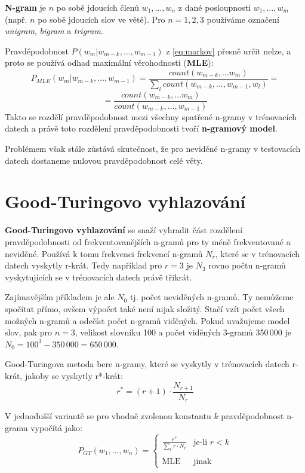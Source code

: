 \documentclass[12pt,a4paper]{report}
\begin{document}
\textbf{N-gram} je $n$ po sobě jdoucích členů $w_{1},\ldots,w_{n}$ z dané posloupnosti $w_{1},\ldots,w_{m}$ (např. $n$ po sobě jdoucích slov ve větě). Pro $n = 1, 2, 3$ používáme označení \textit{unigram}, \textit{bigram} a \textit{trigram}.

Pravděpodobnost $P(w_{m}|w_{m-k}, \ldots, w_{m-1})$ z \eqref{eq:markov} přesně určit nelze, a proto se používá odhad maximální věrohodnosti (\textbf{MLE}):
\begin{equation}\label{eq:pmle}
P_{MLE}(w_{m}|w_{m-k}, \ldots, w_{m-1}) = \frac{count(w_{m-k}, \ldots w_{m})}{\sum_{l} count(w_{m-k},\ldots,w_{m-1}, w_{l})} =
\end{equation}
\begin{equation}\nonumber
= \frac{count(w_{m-k}, \ldots w_{m})}{count(w_{m-k},\ldots,w_{m-1})}
\end{equation}
Takto se rozdělí pravděpodobnost mezi všechny spatřené n-gramy v trénovacích datech a právě toto rozdělení pravděpodobnosti tvoří \textbf{n-gramový model}.

Problémem však stále zůstává skutečnost, že pro neviděné n-gramy v testovacích datech dostaneme nulovou pravděpodobnost celé věty.

\section{Good-Turingovo vyhlazování}
\textbf{Good-Turingovo vyhlazování} se snaží vyhradit část rozdělení pravděpodobnosti od frekventovanějších n-gramů pro ty méně frekventované a neviděné. Používá k tomu frekvenci frekvencí n-gramů $N_r$, které se v trénovacích datech vyskytly r-krát. Tedy například pro $r=3$ je $N_3$ rovno počtu n-gramů vyskytujících se v trénovacích datech právě třikrát. 

Zajímavějším příkladem je ale $N_0$ tj. počet neviděných n-gramů. Ty nemůžeme spočítat přímo, ovšem výpočet také není nijak složitý. Stačí vzít počet všech možných n-gramů a odečíst počet n-gramů viděných. Pokud uvažujeme model slov, pak pro $n=3$, velikost slovníku 100 a počet viděných 3-gramů 350\,000 je $N_0 = 100^3 - 350\,000 = 650\,000$.

Good-Turingova metoda bere n-gramy, které se vyskytly v trénovacích datech r-krát, jakoby se vyskytly r*-krát:
\begin{equation}\label{eq:gtr1}
r^* = (r+1) \cdot \frac {N_{r+1}}{N_r}
\end{equation}

V jednodušší variantě se pro vhodně zvolenou konstantu $k$ pravděpodobnost n-gramu vypočítá jako:
\begin{equation}
P_{GT}(w_{1},\ldots,w_{n}) = \left\{
\begin{array}{ll}
\displaystyle \frac{r^*}{\sum_{r}r\cdot N_r} & \text{je-li $r < k$}\\
&\\
\text{MLE} & \text{jinak}
\end{array} \right.
\end{equation}
\end{document}
